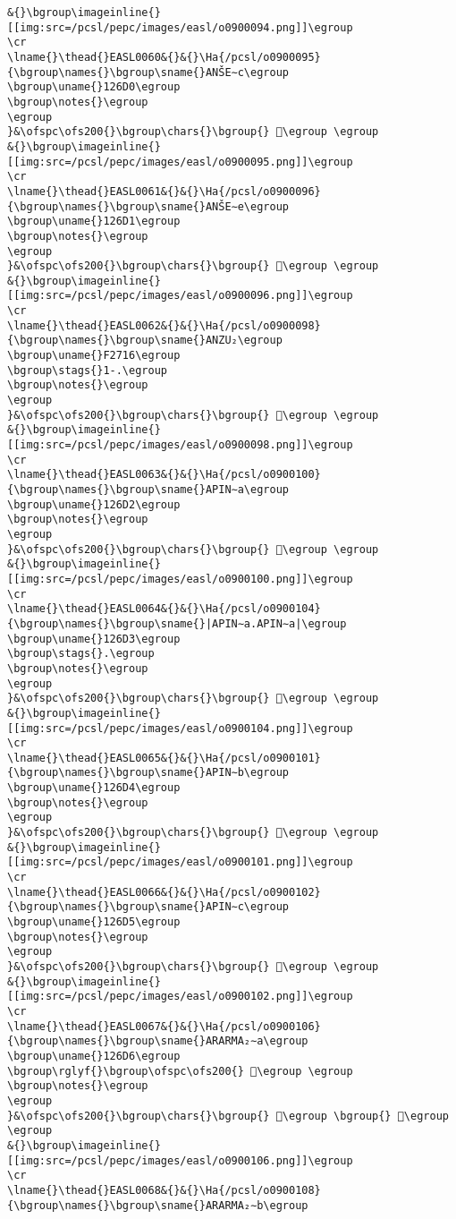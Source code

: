 \begin{verbatim}
&{}\bgroup\imageinline{}[[img:src=/pcsl/pepc/images/easl/o0900094.png]]\egroup
\cr
\lname{}\thead{}EASL0060&{}&{}\Ha{/pcsl/o0900095}{\bgroup\names{}\bgroup\sname{}ANŠE∼c\egroup
\bgroup\uname{}126D0\egroup
\bgroup\notes{}\egroup
\egroup
}&\ofspc\ofs200{}\bgroup\chars{}\bgroup{} 𒛐\egroup \egroup
&{}\bgroup\imageinline{}[[img:src=/pcsl/pepc/images/easl/o0900095.png]]\egroup
\cr
\lname{}\thead{}EASL0061&{}&{}\Ha{/pcsl/o0900096}{\bgroup\names{}\bgroup\sname{}ANŠE∼e\egroup
\bgroup\uname{}126D1\egroup
\bgroup\notes{}\egroup
\egroup
}&\ofspc\ofs200{}\bgroup\chars{}\bgroup{} 𒛑\egroup \egroup
&{}\bgroup\imageinline{}[[img:src=/pcsl/pepc/images/easl/o0900096.png]]\egroup
\cr
\lname{}\thead{}EASL0062&{}&{}\Ha{/pcsl/o0900098}{\bgroup\names{}\bgroup\sname{}ANZU₂\egroup
\bgroup\uname{}F2716\egroup
\bgroup\stags{}1-.\egroup
\bgroup\notes{}\egroup
\egroup
}&\ofspc\ofs200{}\bgroup\chars{}\bgroup{} 󲜖\egroup \egroup
&{}\bgroup\imageinline{}[[img:src=/pcsl/pepc/images/easl/o0900098.png]]\egroup
\cr
\lname{}\thead{}EASL0063&{}&{}\Ha{/pcsl/o0900100}{\bgroup\names{}\bgroup\sname{}APIN∼a\egroup
\bgroup\uname{}126D2\egroup
\bgroup\notes{}\egroup
\egroup
}&\ofspc\ofs200{}\bgroup\chars{}\bgroup{} 𒛒\egroup \egroup
&{}\bgroup\imageinline{}[[img:src=/pcsl/pepc/images/easl/o0900100.png]]\egroup
\cr
\lname{}\thead{}EASL0064&{}&{}\Ha{/pcsl/o0900104}{\bgroup\names{}\bgroup\sname{}|APIN∼a.APIN∼a|\egroup
\bgroup\uname{}126D3\egroup
\bgroup\stags{}.\egroup
\bgroup\notes{}\egroup
\egroup
}&\ofspc\ofs200{}\bgroup\chars{}\bgroup{} 𒛓\egroup \egroup
&{}\bgroup\imageinline{}[[img:src=/pcsl/pepc/images/easl/o0900104.png]]\egroup
\cr
\lname{}\thead{}EASL0065&{}&{}\Ha{/pcsl/o0900101}{\bgroup\names{}\bgroup\sname{}APIN∼b\egroup
\bgroup\uname{}126D4\egroup
\bgroup\notes{}\egroup
\egroup
}&\ofspc\ofs200{}\bgroup\chars{}\bgroup{} 𒛔\egroup \egroup
&{}\bgroup\imageinline{}[[img:src=/pcsl/pepc/images/easl/o0900101.png]]\egroup
\cr
\lname{}\thead{}EASL0066&{}&{}\Ha{/pcsl/o0900102}{\bgroup\names{}\bgroup\sname{}APIN∼c\egroup
\bgroup\uname{}126D5\egroup
\bgroup\notes{}\egroup
\egroup
}&\ofspc\ofs200{}\bgroup\chars{}\bgroup{} 𒛕\egroup \egroup
&{}\bgroup\imageinline{}[[img:src=/pcsl/pepc/images/easl/o0900102.png]]\egroup
\cr
\lname{}\thead{}EASL0067&{}&{}\Ha{/pcsl/o0900106}{\bgroup\names{}\bgroup\sname{}ARARMA₂∼a\egroup
\bgroup\uname{}126D6\egroup
\bgroup\rglyf{}\bgroup\ofspc\ofs200{} 𒛖\egroup \egroup
\bgroup\notes{}\egroup
\egroup
}&\ofspc\ofs200{}\bgroup\chars{}\bgroup{} 𒛗\egroup \bgroup{} 𒛖\egroup \egroup
&{}\bgroup\imageinline{}[[img:src=/pcsl/pepc/images/easl/o0900106.png]]\egroup
\cr
\lname{}\thead{}EASL0068&{}&{}\Ha{/pcsl/o0900108}{\bgroup\names{}\bgroup\sname{}ARARMA₂∼b\egroup

\end{verbatim}
